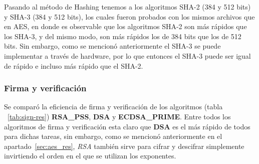 \documentclass[../main.tex]{subfiles}
\begin{document}
Pasando al método de Hashing tenemos a los algoritmos SHA-2 (384 y 512 bits) y SHA-3 (384 y 512 bits), los cuales fueron probados con los mismos archivos que en AES, en donde es observable que los algoritmos SHA-2 son más rápidos que los SHA-3, y del mismo modo, son más rápidos los de 384 bits que los de 512 bits. Sin embargo, como se mencionó anteriormente el SHA-3 se puede implementar a través de hardware, por lo que entonces el SHA-3 puede ser igual de rápido e incluso más rápido que el SHA-2.

\subsubsection{Firma y verificación}\label{sec:firma-y-verificacion}
Se comparó la eficiencia de firma y verificación de los algoritmos (tabla
~\ref{tab:sign-res}) \textbf{RSA\_PSS}, \textbf{DSA} y \textbf{ECDSA\_PRIME}. Entre todos
los algoritmos de firma y verificación esta claro que \textbf{DSA} es el más rápido de
todos para dichas tareas, sin embargo, como se mencionó anteriormente en el
apartado~\ref{sec:aes_res}, \textit{RSA} también sirve para cifrar y descifrar
simplemente invirtiendo el orden en el que se utilizan los exponentes.
\end{document}
